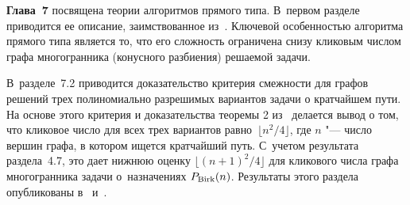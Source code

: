 \textbf{Глава~7} посвящена теории алгоритмов прямого типа.
В~первом разделе приводится ее описание, заимствованное из~\cite{BondBook:1995}. %
Ключевой особенностью алгоритма прямого типа является то, что его сложность ограничена снизу кликовым числом графа многогранника (конусного разбиения) решаемой задачи.
\begin{comment}
Известно~(см. обзор в~разделе~2.3.3), что для классических полиномиально разрешимых задач (сортировка, минимальное остовное дерево, минимальный разрез) эта характеристика не превосходит размерности многогранника.
С~другой стороны, в~главах~3 и~4 показано, что булевы квадратичные многогранники $\BQP$ аффинно сводятся к~многогранникам таких NP-трудных задач, как коммивояжер, рюкзак, 3-выполнимость, 3-сочетание, покрытие и~упаковка множества, раскраска графа, кубический подграф и~многие другие. Учитывая, что кликовое число графа многогранника $\BQP(n)$ равно $2^n$, кликовые числа графов многогранников указанных задач также сверхполиномиальны по размерности многогранников.
Кроме того, в~\cite{BondBook:1995} установлено, что некоторые алгоритмы сортировки, жадный алгоритм для минимального остовного дерева,
алгоритм Дейкстры для кратчайшего пути, алгоритм Хелда--Карпа 
и реализация алгоритма ветвей и~границ для задачи коммивояжера
являются прямыми или <<прямыми>>.
\end{comment}

В~разделе~7.2 приводится доказательство критерия смежности для графов решений трех полиномиально разрешимых вариантов задачи о кратчайшем пути.
На основе этого критерия и доказательства теоремы 2 из~\cite{Bondarenko:1993SW3A} делается вывод о том, что кликовое число для всех трех вариантов равно~$\lfloor n^2 / 4\rfloor$, где $n$ "--- число вершин графа, в котором ищется кратчайший путь.
С~учетом результата раздела~4.7, это дает нижнюю оценку $\lfloor (n+1)^2 / 4\rfloor$ для кликового числа графа многогранника задачи о~назначениях $P_{\textup{Birk}}(n)$.
Результаты этого раздела опубликованы в~ и~.

